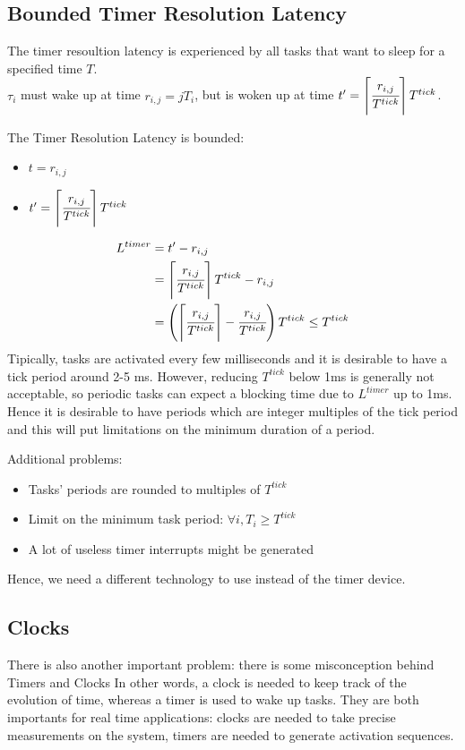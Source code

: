 \subsection{Bounded Timer Resolution Latency}
The timer resoultion latency is experienced by all tasks that want to sleep for a specified time $T$.\\
$\tau_i$ must wake up at time $r_{i,j} = j T_i$, but is woken up at time $t' = \left\lceil \cfrac{r_{i,j}}{T^{tick}} \right\rceil T^{tick}$.

The Timer Resolution Latency is bounded:
\begin{itemize}
    \item $t = r_{i,j}$
    \item $t' = \left\lceil \cfrac{r_{i,j}}{T^{tick}} \right\rceil T^{tick}$
\end{itemize}
\begin{align*}
    L^{timer} &= t' - r_{i,j}\\
&= \left\lceil \cfrac{r_{i,j}}{T^{tick}} \right\rceil T^{tick}- r_{i,j}\\
&= \left(\left\lceil \cfrac{r_{i,j}}{T^{tick}} \right\rceil - \cfrac{r_{i,j}}{T^{tick}}\right) T^{tick} \le T^{tick}
\end{align*}
Tipically, tasks are activated every few milliseconds and it is desirable to have a tick period around 2-5 ms. However, reducing $T^{tick}$ below 1ms is generally not acceptable, so periodic tasks can expect a blocking time due to $L^{timer}$ up to 1ms. Hence it is desirable to have periods which are integer multiples of the tick period and this will put limitations on the minimum duration of a period.

Additional problems:
\begin{itemize}
    \item Tasks' periods are rounded to multiples of $T^{tick}$
    \item Limit on the minimum task period: $\forall i, T_{i}\ge T^{tick}$
    \item A lot of useless timer interrupts might be generated
\end{itemize}
Hence, we need a different technology to use instead of the timer device.

\subsection{Clocks}
There is also another important problem: there is some misconception behind Timers and Clocks
In other words, a clock is needed to keep track of the evolution of time, whereas a timer is used to wake up tasks. They are both importants for real time applications: clocks are needed to take precise measurements on the system, timers are needed to generate activation sequences.

